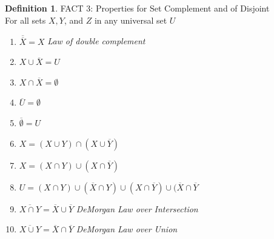 \documentclass{book}
\theoremstyle{definition}
\newtheorem{definition}{Definition}[section]
\theoremstyle{remark}
\begin{document}
\begin{definition}
FACT 3: Properties for Set Complement and of Disjoint \\

For all sets $X, Y$, and $Z$ in any universal set $U$ \\

    \begin{enumerate}
        \item $\overline{\overline{X}} = X$ \textit{Law of double complement}
        \item $X \cup \overline{X} = U$
        \item $X \cap \overline{X} = \emptyset$
        \item $\overline{U} = \emptyset$
        \item $\overline{\emptyset} = U$ 
        \item $X = (X \cup Y) \cap (X \cup \overline{Y})$
        \item $X = (X \cap Y) \cup (X \cap \overline{Y})$
        \item $U = (X \cap Y) \cup (\overline{X} \cap Y) \cup (X \cap \overline{Y}) \cup (\overline{X} \cap \overline{Y}$
        \item $\overline{X \cap Y} = \overline{X} \cup \overline{Y}$ \textit{DeMorgan Law over Intersection}
        \item $\overline{X \cup Y} = \overline{X} \cap \overline{Y}$ \textit{DeMorgan Law over Union}
    \end{enumerate}
\end{definition}
\end{document}
